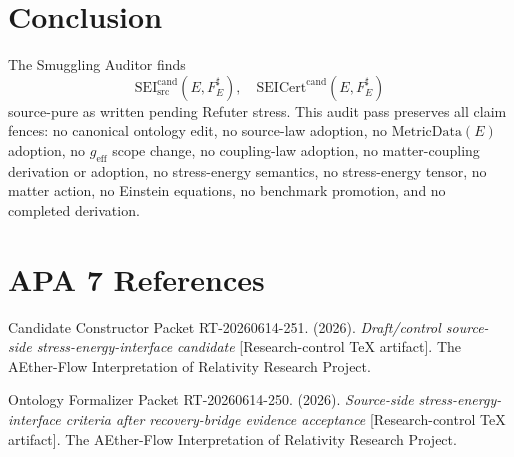 \documentclass[11pt]{article}
\newcommand{\MetricData}{\mathrm{MetricData}}
\newcommand{\geff}{g_{\mathrm{eff}}}
\newcommand{\SEICand}{\mathrm{SEI}_{\mathrm{src}}^{\mathrm{cand}}}
\newcommand{\SEICertCand}{\mathrm{SEICert}^{\mathrm{cand}}}
\begin{document}
\section{Conclusion}

The Smuggling Auditor finds
\[
  \SEICand(E,F_E^\sharp),\quad \SEICertCand(E,F_E^\sharp)
\]
source-pure as written pending Refuter stress. This audit pass preserves all
claim fences: no canonical ontology edit, no source-law adoption, no
\(\MetricData(E)\) adoption, no \(\geff\) scope change, no coupling-law
adoption, no matter-coupling derivation or adoption, no stress-energy
semantics, no stress-energy tensor, no matter action, no Einstein equations,
no benchmark promotion, and no completed derivation.

\section{APA 7 References}

Candidate Constructor Packet RT-20260614-251. (2026). \emph{Draft/control
source-side stress-energy-interface candidate} [Research-control TeX
artifact]. The AEther-Flow Interpretation of Relativity Research Project.

Ontology Formalizer Packet RT-20260614-250. (2026). \emph{Source-side
stress-energy-interface criteria after recovery-bridge evidence acceptance}
[Research-control TeX artifact]. The AEther-Flow Interpretation of Relativity
Research Project.
\end{document}
